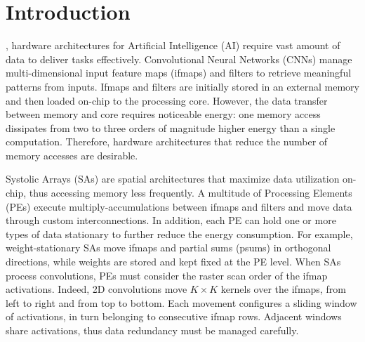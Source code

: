 \section{Introduction}

, hardware architectures for Artificial Intelligence (AI) require vast amount of data to deliver tasks effectively. Convolutional Neural Networks (CNNs) manage multi-dimensional input feature maps (ifmaps) and filters to retrieve meaningful patterns from inputs\cite{Sze_17,Li_22}. Ifmaps and filters are initially stored in an external memory and then loaded on-chip to the processing core. However, the data transfer between memory and core requires noticeable energy: one memory access dissipates from two to three orders of magnitude higher energy than a single computation\cite{Horowitz_14}. Therefore, hardware architectures that reduce the number of memory accesses are desirable\cite{Capra_20}.

Systolic Arrays (SAs) are spatial architectures that maximize data utilization on-chip, thus accessing memory less frequently\cite{Xu_23}. A multitude of Processing Elements (PEs) execute multiply-accumulations between ifmaps and filters and move data through custom interconnections. In addition, each PE can hold one or more types of data stationary to further reduce the energy consumption. For example, weight-stationary SAs move ifmaps and partial sums (psums) in orthogonal directions, while weights are stored and kept fixed at the PE level\cite{Wu_22}. When SAs process convolutions, PEs must consider the raster scan order of the ifmap activations. Indeed, 2D convolutions move $K \times K$ kernels over the ifmaps, from left to right and from top to bottom. Each movement configures a sliding window of activations, in turn belonging to consecutive ifmap rows. Adjacent windows share activations, thus data redundancy must be managed carefully. 

